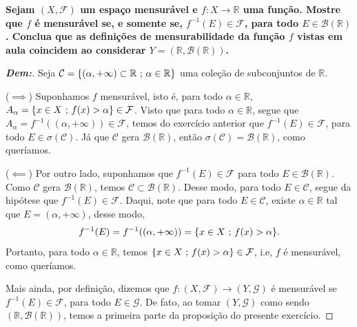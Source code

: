 \biglinend
{}
\bigline 
\textbf{Sejam $(X, \mathcal F)$ um espaço mensurável e $f: X \rightarrow \mathbb R$ uma 
função. Mostre que $f$ é mensurável se, e somente se, $f^{-1}(E) \in \mathcal F$, 
para todo $E \in \mathcal B(\mathbb R)$. Conclua que as definições de mensurabilidade
da função $f$ vistas em aula coincidem ao considerar $Y=(\mathbb R, \mathcal B(\mathbb R))$.
}
\begin{proof}[\textbf{Dem:}]Seja  
  $\mathcal C=\{(\alpha, +\infty)\subset \mathbb R\text{ ; }  \alpha \in \mathbb R\}$ uma coleção de 
  subconjuntos de $\mathbb R$. 

  \vspace{3mm}
($\implies$) Suponhamos $f$ mensurável, isto é,
  para todo $\alpha \in \mathbb R$, 
  $A_{\alpha} = \{x \in X\text{ ; }  f(x) > \alpha\} \in \mathcal F$.  
   Visto que para todo $\alpha \in \mathbb R$, segue que 
  $A_\alpha = f^{-1}((\alpha, +\infty)) \in \mathcal F$, temos do exercício anterior que
  $f^{-1}(E) \in \mathcal F$, para todo $E \in \sigma(\mathcal C)$. Já que 
  $\mathcal C$ gera $\mathcal B(\mathbb R)$, então 
  $\sigma(\mathcal C) = \mathcal B (\mathbb R)$, como queríamos.

  
  ($\impliedby$) Por outro lado, suponhamos que $f^{-1}(E) \in \mathcal F$ para todo $E \in 
  \mathcal B(\mathbb R)$. Como $\mathcal C$ gera $\mathcal B(\mathbb R)$, temos 
  $\mathcal C \subset \mathcal B(\mathbb R)$. Desse modo, para todo $E \in \mathcal C$, 
  segue da hipótese que $f^{-1}(E) \in \mathcal F$. Daqui, note que para todo 
  $E \in \mathcal C$, existe $\alpha \in \mathbb R$ tal que $E = (\alpha, +\infty)$, 
  desse modo, 
  \begin{align*}
    f^{-1}(E) = f^{-1}((\alpha, +\infty)) = \{x\in X\text{ ; }  f(x) > \alpha\}.
  \end{align*}
  Portanto, para todo $\alpha \in \mathbb R$, temos 
  $\{x \in X\text{ ; }  f(x)>\alpha \} \in \mathcal F$, i.e, $f$ é mensurável, como queríamos.

  Mais ainda, por definição, dizemos que $f: (X,\mathcal F) \rightarrow (Y, \mathcal G)$ é
  mensurável se $f^{-1}(E) \in \mathcal F$, para todo $E \in \mathcal G$. De fato, ao tomar 
  $(Y, \mathcal G)$ como sendo $(\mathbb R, \mathcal B(\mathbb R))$, temos a primeira parte
  da proposição do presente exercício.
\end{proof}

